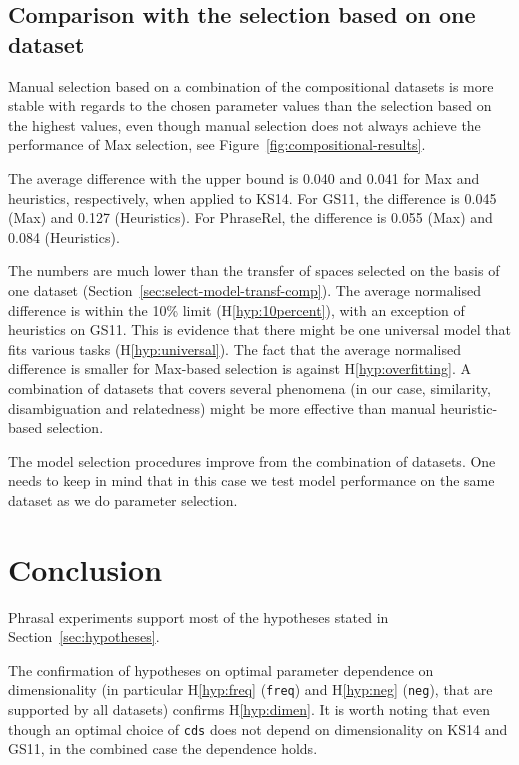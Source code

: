 \subsection{Comparison with the selection based on one dataset}
\label{sec:comp-with-single-comp}

Manual selection based on a combination of the compositional datasets is more stable with regards to the chosen parameter values than the selection based on the highest values, even though manual selection does not always achieve the performance of Max selection, see Figure~\ref{fig:compositional-results}.

The average difference with the upper bound is 0.040 and 0.041 for Max and heuristics, respectively, when applied to KS14. For GS11, the difference is 0.045 (Max) and 0.127 (Heuristics). For PhraseRel, the difference is 0.055 (Max) and 0.084 (Heuristics).

The numbers are much lower than the transfer of spaces selected on the basis of one dataset (Section~\ref{sec:select-model-transf-comp}). The average normalised difference is within the 10\% limit (H\ref{hyp:10percent}), with an exception of heuristics on GS11. This is evidence that there might be one universal model that fits various tasks (H\ref{hyp:universal}). The fact that the average normalised difference is smaller for Max-based selection is against H\ref{hyp:overfitting}. A combination of datasets that covers several phenomena (in our case, similarity, disambiguation and relatedness) might be more effective than manual heuristic-based selection.

The model selection procedures improve from the combination of datasets. One needs to keep in mind that in this case we test model performance on the same dataset as we do parameter selection.

\section{Conclusion}
\label{sec:conclusion-comp}

Phrasal experiments support most of the hypotheses stated in
Section~\ref{sec:hypotheses}.

The confirmation of hypotheses on optimal parameter dependence on dimensionality (in particular H\ref{hyp:freq} (\texttt{freq}) and H\ref{hyp:neg} (\texttt{neg}), that are supported by all datasets) confirms H\ref{hyp:dimen}. It is worth noting that even though an optimal choice of \texttt{cds} does not depend on dimensionality on KS14 and GS11, in the combined case the dependence holds.

